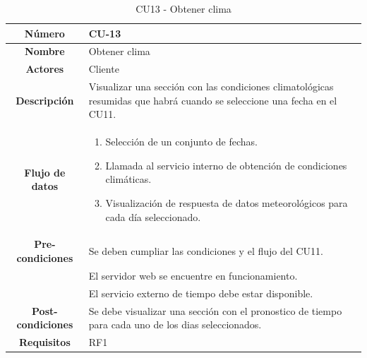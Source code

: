\begin{table}[h!tb]
	\centering
	\begin{adjustbox}{width=1\textwidth}
	\begin{tabular}{|c|p{\textwidth}|}
		\hline {\bf Número} & CU-13 \\
		\hline {\bf Nombre} & Obtener clima\\
		\hline {\bf Actores} & Cliente \\
		\hline {\bf Descripción} & Visualizar una sección con las condiciones climatológicas resumidas que habrá cuando se seleccione una fecha en el CU11. \\
		\hline {\bf Flujo de datos}
		& 
		\begin{enumerate}
			\item Selección de un conjunto de fechas.
			\item Llamada al servicio interno de obtención de condiciones climáticas.
			\item Visualización de respuesta de datos meteorológicos para cada día seleccionado.
           
        \end{enumerate}\\
		\hline {\bf Pre-condiciones}
        & Se deben cumpliar las condiciones y el flujo del CU11. \\
		& El servidor web se encuentre en funcionamiento. \\
        & El servicio externo de tiempo debe estar disponible. \\
     
       \hline {\bf Post-condiciones}
		& Se debe visualizar una sección con el pronostico de tiempo para cada uno de los dias seleccionados.\\
		\hline {\bf Requisitos} & RF1 \\
		\hline 
	\end{tabular}
	\end{adjustbox}
	\caption{CU13 - Obtener clima\label{tbl:CU13}}
\end{table}
